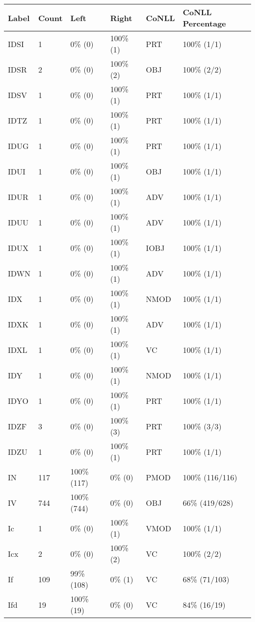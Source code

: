 \begin{figure*}
\begin{tabular}{|l|l|l|l||l|l|}
\hline
Label & Count & Left & Right & CoNLL & CoNLL Percentage\\ 
\hline
 IDSI & 1 & 0\% (0) & 100\% (1) & PRT & 100\% (1/1) \\ 
\hline
 IDSR & 2 & 0\% (0) & 100\% (2) & OBJ & 100\% (2/2) \\ 
\hline
 IDSV & 1 & 0\% (0) & 100\% (1) & PRT & 100\% (1/1) \\ 
\hline
 IDTZ & 1 & 0\% (0) & 100\% (1) & PRT & 100\% (1/1) \\ 
\hline
 IDUG & 1 & 0\% (0) & 100\% (1) & PRT & 100\% (1/1) \\ 
\hline
 IDUI & 1 & 0\% (0) & 100\% (1) & OBJ & 100\% (1/1) \\ 
\hline
 IDUR & 1 & 0\% (0) & 100\% (1) & ADV & 100\% (1/1) \\ 
\hline
 IDUU & 1 & 0\% (0) & 100\% (1) & ADV & 100\% (1/1) \\ 
\hline
 IDUX & 1 & 0\% (0) & 100\% (1) & IOBJ & 100\% (1/1) \\ 
\hline
 IDWN & 1 & 0\% (0) & 100\% (1) & ADV & 100\% (1/1) \\ 
\hline
 IDX & 1 & 0\% (0) & 100\% (1) & NMOD & 100\% (1/1) \\ 
\hline
 IDXK & 1 & 0\% (0) & 100\% (1) & ADV & 100\% (1/1) \\ 
\hline
 IDXL & 1 & 0\% (0) & 100\% (1) & VC & 100\% (1/1) \\ 
\hline
 IDY & 1 & 0\% (0) & 100\% (1) & NMOD & 100\% (1/1) \\ 
\hline
 IDYO & 1 & 0\% (0) & 100\% (1) & PRT & 100\% (1/1) \\ 
\hline
 IDZF & 3 & 0\% (0) & 100\% (3) & PRT & 100\% (3/3) \\ 
\hline
 IDZU & 1 & 0\% (0) & 100\% (1) & PRT & 100\% (1/1) \\ 
\hline
 IN & 117 & 100\% (117) & 0\% (0) & PMOD & 100\% (116/116) \\ 
\hline
 IV & 744 & 100\% (744) & 0\% (0) & OBJ & 66\% (419/628) \\ 
\hline
 Ic & 1 & 0\% (0) & 100\% (1) & VMOD & 100\% (1/1) \\ 
\hline
 Icx & 2 & 0\% (0) & 100\% (2) & VC & 100\% (2/2) \\ 
\hline
 If & 109 & 99\% (108) & 0\% (1) & VC & 68\% (71/103) \\ 
\hline
 Ifd & 19 & 100\% (19) & 0\% (0) & VC & 84\% (16/19) \\ 

\end{tabular}
\end{figure*}
